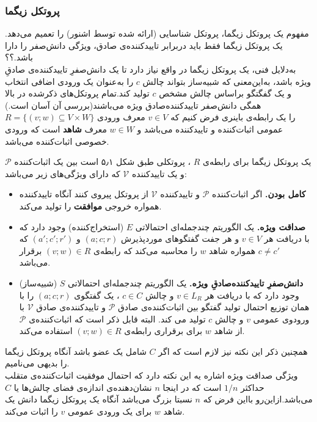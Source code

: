 \subsubsection{پروتکل زیگما}\label{sigma_protocols}

مفهوم یک پروتکل زیگما، پروتکل شناسایی (ارائه شده توسط اشنور) را تعمیم می‌دهد. یک پروتکل زیگما فقط باید دربرابر تاییدکننده‌ی صادق، ویژگی دانش‌صفر را دارا باشد.؟؟
\\
به‌دلایل فنی، یک پروتکل زیگما در واقع نیاز دارد تا یک دانش‌صفرِ ‌تاییدکننده‌ی صادقِ ویژه باشد، به‌این‌معنی که شبیه‌ساز بتواند چالش
$c$
را به‌عنوان یک ورودی اضافی انتخاب و یک گفگتگو براساس چالش مشخص
$c$
تولید کند.تمام پروتکل‌های ذکرشده در بالا همگی دانش‌صفر تاییدکننده‌صادق ویژه می‌باشند(بررسی آن آسان است.)
\\

$R = \{ (v;w) \subseteq V \times W \}$
را یک رابطه‌ی باینری فرض کنیم که 
$v \in V$
معرف ورودی عمومی اثبات‌کننده و تاییدکننده می‌باشد و 
$w \in W$
معرف
\textbf{شاهد}
است که ورودی خصوصی اثبات‌کننده می‌باشد.
  
یک پروتکل زیگما برای رابطه‌ی
$R$
، پروتکلی طبق شکل ۵٫۱ است بین یک اثبات‌کننده
$\mathcal{P}$
و یک تاییدکننده
$\mathcal{V}$
که دارای ویژگی‌های زیر می‌باشد:
\begin{itemize}
\item{ \textbf{کامل بودن.}}
اگر اثبات‌کننده
$\mathcal{P}$
و تاییدکننده
$\mathcal{V}$
از پروتکل پیروی کنند آنگاه تاییدکننده همواره خروجی 
\textbf{موافقت}
را تولید می‌کند.
\item{\textbf{صداقت ویژه.}}
یک الگوریتم چندجمله‌ای احتمالاتی 
$E$
(استخراج‌کننده) وجود دارد که با دریافت هر 
$v \in V$
و هر جفت گفتگوهای موردپذیرش
$(a;c;r)$
و
$(a';c';r')$
که
$c \neq c'$
همواره شاهد
$w$
را محاسبه می‌کند که رابطه‌ی
$(v;w) \in R$
 برقرار می‌باشد.
\item{\textbf{دانش‌صفرِ تاییدکننده‌صادقِ ویژه.}}
یک الگوریتم چندجمله‌ای احتمالاتی 
$S$
(شبیه‌ساز) وجود دارد که با دریافت هر
$v \in L_R$
و چالش
$c \in C$
، یک گفتگوی
$(a;c;r)$
را با همان توزیع احتمال تولید گفتگو بین اثبات‌کننده‌ی صادق
$\mathcal{P}$
و تاییدکننده‌ی صادق
$\mathcal{V}$
با ورودوی عمومی 
$v$
و چالش
$c$
تولید می کند. البته قابل ذکر است که اثبات‌کننده‌ی
$\mathcal{P}$
از شاهد
$w$
برای برقراری رابطه‌ی
$(v;w) \in R$
استفاده می‌کند.
\end{itemize}
همچنین ذکر این نکته نیز لازم است که اگر 
$C$
شامل یک عضو باشد آنگاه پروتکل زیگما را بدیهی می‌نامیم.
\\

ویژگی صداقت ویژه اشاره یه این نکته دارد که احتمال موفقیت اثبات‌کننده‌ی متقلب حداکثر
$1/n$
است که در اینجا
$n$
نشان‌دهنده‌ی اندازه‌ی فضای چالش‌ها یا
$C$
می‌باشد.ازاین‌رو بااین فرض که 
$n$
نسبتا بزرگ می‌باشد آنگاه یک پروتکل زیگما دانش یک شاهد
$w$
برای یک ورودی عمومی
$v$
را اثبات می‌کند.

